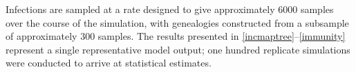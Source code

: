 Infections are sampled at a rate designed to give approximately 6000 samples over the course of the simulation, with genealogies constructed from a subsample of approximately 300 samples.  The results presented in \ref{incmaptree}--\ref{immunity} represent a single representative model output; one hundred replicate simulations were conducted to arrive at statistical estimates. 

